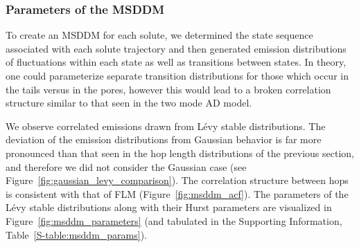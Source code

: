 \documentclass[aps,pre,preprint,groupedaddress,longbibliography]{revtex4-2}
\begin{document}

  \subsubsection{Parameters of the MSDDM}\label{section:msddm_parameterization}

  To create an MSDDM for each solute, we determined the state sequence associated
  with each solute trajectory and then generated emission distributions of fluctuations
  within each state as well as transitions between states. In theory, one could 
  parameterize separate transition distributions for those which occur in the tails 
  versus in the pores, however this would lead to a broken correlation structure 
  similar to that seen in the two mode AD model.

  We observe correlated emissions drawn from L\'evy stable distributions. The 
  deviation of the emission distributions from Gaussian behavior is far more pronounced
  than that seen in the hop length distributions of the previous section, and therefore we 
  did not consider the Gaussian case (see Figure~\ref{fig:gaussian_levy_comparison}).
  The correlation structure between hops is consistent with that of FLM (Figure~\ref{fig:msddm_acf}).
  The parameters of the L\'evy stable distributions along with their Hurst parameters 
  are visualized in Figure~\ref{fig:msddm_parameters} (and tabulated in the Supporting
  Information, Table~\ref{S-table:msddm_params}). 
  
\end{document}
